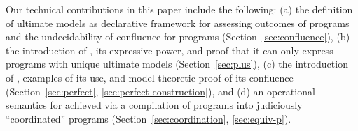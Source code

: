 Our technical contributions in this paper include the following: (a) the definition of ultimate models as declarative framework for assessing outcomes of \lang programs and the undecidability of confluence for \lang programs (Section~\ref{sec:confluence}), (b) the introduction of \slang, its expressive power, and proof that it can only express programs with unique ultimate models (Section~\ref{sec:plus}), (c) the introduction of \plang, examples of its use, and model-theoretic proof of its confluence (Section~\ref{sec:perfect}, \ref{sec:perfect-construction}), and (d) an operational semantics for \plang achieved via a compilation of \plang programs into judiciously ``coordinated'' \lang programs (Section~\ref{sec:coordination}, \ref{sec:equiv-p}).

% 
% 
% 
